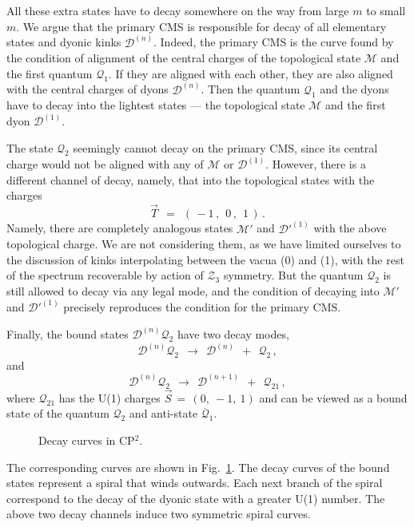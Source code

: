\documentclass[epsfig,12pt]{article}
\def\beq{\begin{equation}}
\def\eeq{\end{equation}}
\def\beq{\begin{equation}}
\def\eeq{\end{equation}}
\newcommand{\ov}{\overline}
\newcommand{\mc}[1]{\mathcal{#1}}
\begin{document}
	All these extra states have to decay somewhere on the way from large $ m $ to small $ m $.
	We argue that the primary CMS 
\cite{Bolokhov:2011mp}
	is responsible for decay of all elementary states and dyonic kinks $ \mc{D}^{(n)} $.
	Indeed, the primary CMS is the curve found by the condition of alignment of the central 
	charges of the topological state $ \mc{M} $ and the first quantum $ \mc{Q}_1 $.
	If they are aligned with each other, they are also aligned with the central charges of dyons $ \mc{D}^{(n)} $.
	Then the quantum $ \mc{Q}_1 $ and the dyons have to decay into the lightest states ---
	the topological state $ \mc{M} $ and the first dyon $ \mc{D}^{(1)} $.

	The state $ \mc{Q}_2 $ seemingly cannot decay on the primary CMS, since its central charge would
	not be aligned with any of $ \mc{M} $ or $ \mc{D}^{(1)} $.
	However, there is a different channel of decay, namely, that into the topological states with the charges
\beq
	\vec{T} ~~=~~ (\, -1\,,~~ 0\,,~~ 1 \,)\,.
\eeq
	Namely, there are completely analogous states $ \mc{M}' $ and $ \mc{D'}^{(1)} $ with the above topological charge.
	We are not considering them, as we have limited ourselves to the discussion of kinks interpolating
	between the vacua ({\sc \small 0}) and ({\sc\small 1}), with the rest of the spectrum recoverable by action of $ \mc{Z}_3 $ symmetry.
	But the quantum $ \mc{Q}_2 $ is still allowed to decay via any legal mode, and the condition of decaying
	into $ \mc{M}' $ and $ \mc{D'}^{(1)} $ precisely reproduces the condition for the primary CMS.

	Finally, the bound states $ \mc{D}^{(n)}\mc{Q}_2 $ have two decay modes,
\beq
	\mc{D}^{(n)}\mc{Q}_2  ~~\to~~  \mc{D}^{(n)} ~~+~~ \mc{Q}_2\,,
\eeq
	and
\beq
	\mc{D}^{(n)}\mc{Q}_2  ~~\to~~  \mc{D}^{(n+1)} ~~+~~ \mc{Q}_{21}\,,
\eeq
	where $ \mc{Q}_{21} $ has the U(1) charges $ \vec{S} \,=\, (0,~-1,~1) $ and can be viewed as a 
	bound state of the quantum $ \mc{Q}_2 $ and anti-state $ \mc{\ov{Q}}_1 $.

\begin{figure}
\begin{center}
\epsfxsize=7.0cm
\caption{Decay curves in CP$^2$.}
\label{fdecay}
\end{center}
\end{figure}
	The corresponding curves are shown in Fig.~\ref{fdecay}. 
	The decay curves of the bound states represent a spiral that winds outwards. 
	Each next branch of the spiral correspond to the decay of the dyonic state with a greater U(1) number.
	The above two decay channels induce two symmetric spiral curves.
\end{document}
